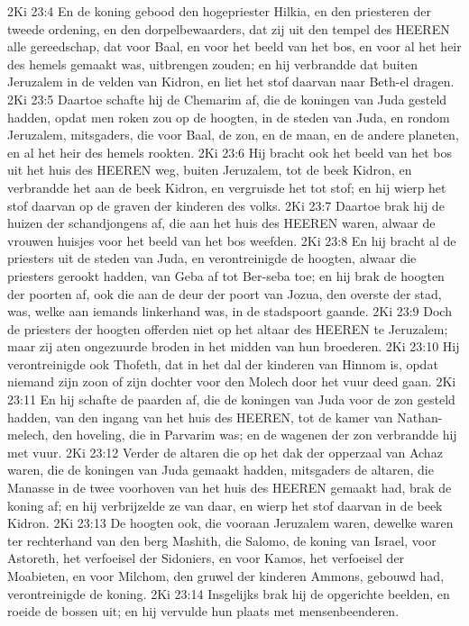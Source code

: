 2Ki 23:4  En de koning gebood den hogepriester Hilkia, en den priesteren der tweede ordening, en den dorpelbewaarders, dat zij uit den tempel des HEEREN alle gereedschap, dat voor Baal, en voor het beeld van het bos, en voor al het heir des hemels gemaakt was, uitbrengen zouden; en hij verbrandde dat buiten Jeruzalem in de velden van Kidron, en liet het stof daarvan naar Beth-el dragen.
2Ki 23:5  Daartoe schafte hij de Chemarim af, die de koningen van Juda gesteld hadden, opdat men roken zou op de hoogten, in de steden van Juda, en rondom Jeruzalem, mitsgaders, die voor Baal, de zon, en de maan, en de andere planeten, en al het heir des hemels rookten.
2Ki 23:6  Hij bracht ook het beeld van het bos uit het huis des HEEREN weg, buiten Jeruzalem, tot de beek Kidron, en verbrandde het aan de beek Kidron, en vergruisde het tot stof; en hij wierp het stof daarvan op de graven der kinderen des volks.
2Ki 23:7  Daartoe brak hij de huizen der schandjongens af, die aan het huis des HEEREN waren, alwaar de vrouwen huisjes voor het beeld van het bos weefden.
2Ki 23:8  En hij bracht al de priesters uit de steden van Juda, en verontreinigde de hoogten, alwaar die priesters gerookt hadden, van Geba af tot Ber-seba toe; en hij brak de hoogten der poorten af, ook die aan de deur der poort van Jozua, den overste der stad, was, welke aan iemands linkerhand was, in de stadspoort gaande.
2Ki 23:9  Doch de priesters der hoogten offerden niet op het altaar des HEEREN te Jeruzalem; maar zij aten ongezuurde broden in het midden van hun broederen.
2Ki 23:10  Hij verontreinigde ook Thofeth, dat in het dal der kinderen van Hinnom is, opdat niemand zijn zoon of zijn dochter voor den Molech door het vuur deed gaan.
2Ki 23:11  En hij schafte de paarden af, die de koningen van Juda voor de zon gesteld hadden, van den ingang van het huis des HEEREN, tot de kamer van Nathan-melech, den hoveling, die in Parvarim was; en de wagenen der zon verbrandde hij met vuur.
2Ki 23:12  Verder de altaren die op het dak der opperzaal van Achaz waren, die de koningen van Juda gemaakt hadden, mitsgaders de altaren, die Manasse in de twee voorhoven van het huis des HEEREN gemaakt had, brak de koning af; en hij verbrijzelde ze van daar, en wierp het stof daarvan in de beek Kidron.
2Ki 23:13  De hoogten ook, die vooraan Jeruzalem waren, dewelke waren ter rechterhand van den berg Mashith, die Salomo, de koning van Israel, voor Astoreth, het verfoeisel der Sidoniers, en voor Kamos, het verfoeisel der Moabieten, en voor Milchom, den gruwel der kinderen Ammons, gebouwd had, verontreinigde de koning.
2Ki 23:14  Insgelijks brak hij de opgerichte beelden, en roeide de bossen uit; en hij vervulde hun plaats met mensenbeenderen.
